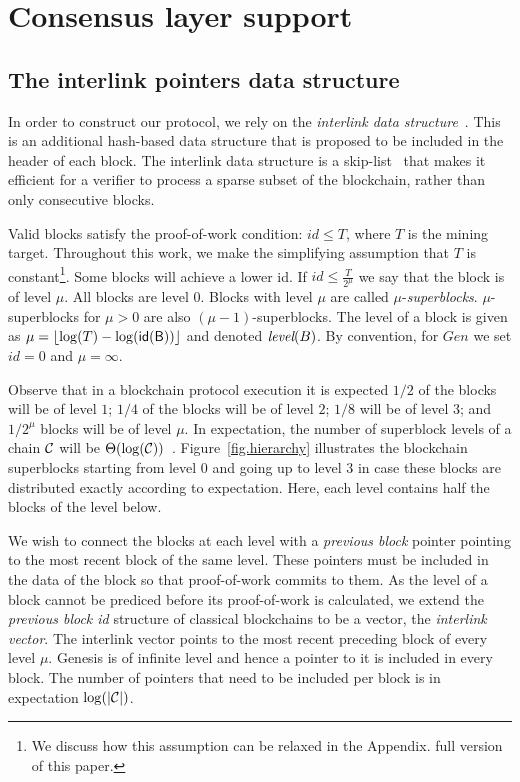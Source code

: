\section{Consensus layer support} \label{sec:consensus}

\subsection{The interlink pointers data structure}
\label{sec:interlink}

In order to construct our protocol, we rely on the \emph{interlink data
structure}~\cite{KLS}. This is an additional hash-based data
structure that is proposed to be included in the header of each block. The
interlink data structure is a skip-list~\cite{skiplist} that makes it efficient
for a verifier to process a sparse subset of the blockchain, rather than only
consecutive blocks.

Valid blocks satisfy the proof-of-work condition: $id \leq T$, where $T$ is the
mining target. Throughout this work, we make the simplifying assumption that $T$
is constant\footnote{We discuss how this assumption can be relaxed in the
\ifhasappendix
Appendix.
\else
full version of this paper.
\fi}. Some blocks will achieve a lower id. If $id \leq
\frac{T}{2^\mu}$ we say that the block is of level $\mu$. All blocks are level
$0$. Blocks with level $\mu$ are called $\mu$-\emph{superblocks}.
$\mu$-superblocks for $\mu > 0$ are also $(\mu - 1)$-superblocks. The level of a
block is given as $\mu = \left \lfloor \log(T) - \log(\sf{id}(B)) \right
\rfloor$ and denoted $\emph{level}(B)$. By convention, for $Gen$ we set $id =
0$ and $\mu = \infty$.

Observe that in a blockchain protocol execution it is expected $1/2$ of the
blocks will be of level $1$; $1/4$ of the blocks will be of level $2$; $1/8$
will be of level $3$; and $1/2^\mu$ blocks will be of level $\mu$. In
expectation, the number of superblock levels of a chain $\mathcal{C}$ will be
$\Theta(\log(\mathcal{C}))$~\cite{KLS}. Figure~\ref{fig.hierarchy} illustrates the
blockchain superblocks starting from level $0$ and going up to level $3$ in case
these blocks are distributed exactly according to expectation. Here, each level
contains half the blocks of the level below.

We wish to connect the blocks at each level with a \emph{previous block}
pointer pointing to the most recent block of the same level. These pointers must
be included in the data of the block so that proof-of-work commits to them. As
the level of a block cannot be prediced before its proof-of-work is calculated,
we extend the \emph{previous block id} structure of classical blockchains to be
a vector, the \emph{interlink vector}. The interlink vector points to the most
recent preceding block of every level $\mu$. Genesis is of infinite level and
hence a pointer to it is included in every block. The number of pointers that
need to be included per block is in expectation $\log(|\mathcal{C}|)$.


